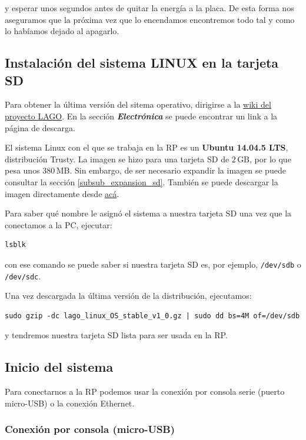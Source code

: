 \documentclass[a4paper,11pt]{article}
\begin{document}
\noindent y esperar unos segundos antes de quitar la energía a la placa. De esta
forma nos aseguramos que la próxima vez que lo encendamos encontremos todo tal
y como lo habíamos dejado al apagarlo.

\subsection{Instalación del sistema LINUX en la tarjeta SD}

Para obtener la última versión del sitema operativo, dirigirse a la
\href{http://wiki.lagoproject.org/index.php?title=Main\_Page}{wiki del proyecto
LAGO}. En la sección \textit{\textbf{Electrónica}} se puede encontrar un link a
la página de descarga. 

El sistema Linux con el que se trabaja en la RP es un \textbf{Ubuntu 14.04.5
LTS},
distribución Trusty. La imagen se hizo para una tarjeta SD de $2\,\text{GB}$, por lo que
pesa unos $380\,\text{MB}$. Sin embargo, de ser necesario expandir la imagen se puede
consultar la sección \ref{subsub_expansion_sd}.
También se puede descargar la imagen directamente desde
\href{https://mega.nz/#!BxZgmLjY!I8BuaMg53Kzo\_eZQKRjOMfJlu95qR2zWT\_BbRXjgNVQ}{acá}.   

\noindent Para saber qué nombre le asignó el sistema a nuestra tarjeta SD una
vez que la conectamos a la PC, ejecutar:
\begin{verbatim}
lsblk
\end{verbatim}
\noindent con ese comando se puede saber si nuestra tarjeta SD es, por ejemplo,
\texttt{/dev/sdb} o \texttt{/dev/sdc}.

\noindent Una vez descargada la última versión de la distribución, ejecutamos:

\begin{verbatim}
sudo gzip -dc lago_linux_OS_stable_v1_0.gz | sudo dd bs=4M of=/dev/sdb
\end{verbatim}

\noindent y tendremos nuestra tarjeta SD lista para ser usada en la RP.

\subsection{Inicio del sistema}

Para conectarnos a la RP podemos usar la conexión por consola serie (puerto
micro-USB) o la conexión Ethernet.

\subsubsection{Conexión por consola (micro-USB)}
\end{document}

